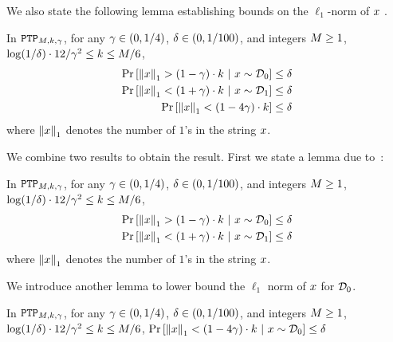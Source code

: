 \iffalse{
\gopi{\st{May be we make the above lemma a proposition?}}\debarshi{All things like the~\cite{DBLP:journals/siamcomp/ChibaN85} result we use is in lemma.}
}\fi 

We also state the following lemma establishing bounds on the $\ell_1$-norm of $x$ . 

\begin{lemma}\label{Lemma: PTP Deviation Bound}
    In $\texttt{PTP}_{M,k,\gamma}$, for any $\gamma \in (0,1/4)$, $\delta \in (0,1/100)$, and integers $M \geq 1$, $\log(1/\delta)\cdot12/\gamma^2\leq k \leq M/6$,
    \begin{align*}
        \Pr\left[{\left\|{x}\right\|_1 > \left({1-\gamma}\right) \cdot k~|~x \sim \mathcal{D}_0}\right] \leq \delta\\
        \Pr\left[{\left\|{x}\right\|_1 < \left({1+\gamma}\right) \cdot k~|~x \sim \mathcal{D}_1}\right] \leq \delta\\
        \Pr\left[{\left\|{x}\right\|_1 < \left({1-4\gamma}\right) \cdot k}\right] \leq \delta
    \end{align*}
    where $\left\|{x}\right\|_1$ denotes the number of $1$'s in the string $x$.
\end{lemma}

We combine two results to obtain the result. First we state a lemma due to~\citep{DBLP:conf/approx/AssadiN22}:

\begin{lemma}\label{Lemma: PTP Deviation Conditional Bound}
    In $\texttt{PTP}_{M,k,\gamma}$, for any $\gamma \in (0,1/4)$, $\delta \in (0,1/100)$, and integers $M \geq 1$, $\log(1/\delta)\cdot12/\gamma^2\leq k \leq M/6$,
    \begin{align*}
        \Pr\left[{\left\|{x}\right\|_1 > \left({1-\gamma}\right) \cdot k~|~x \sim \mathcal{D}_0}\right] \leq \delta\\
        \Pr\left[{\left\|{x}\right\|_1 < \left({1+\gamma}\right) \cdot k~|~x \sim \mathcal{D}_1}\right] \leq \delta
    \end{align*}
    where $\left\|{x}\right\|_1$ denotes the number of $1$'s in the string $x$.
\end{lemma}

We introduce another lemma to lower bound the $\ell_1$ norm of $x$ for $\mathcal{D}_0$.

\begin{lemma}\label{Lemma: PTP Deviation Lower Bound}
    In $\texttt{PTP}_{M,k,\gamma}$, for any $\gamma \in (0,1/4)$, $\delta \in (0,1/100)$, and integers $M \geq 1$, $\log(1/\delta)\cdot12/\gamma^2\leq k \leq M/6$, $\Pr\left[{\left\|{x}\right\|_1 < \left({1-4\gamma}\right) \cdot k~|~x \sim \mathcal{D}_0}\right] \leq \delta$
\end{lemma}

